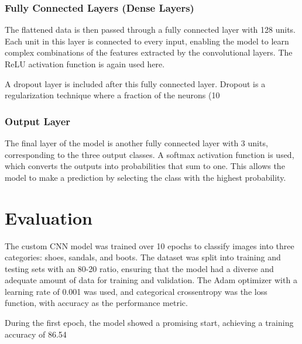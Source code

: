 \documentclass{article}
\begin{document}
            \subsubsection{Fully Connected Layers (Dense Layers)}

                The flattened data is then passed through a fully connected layer with 128 units. Each unit in this layer is connected to every input, enabling the model to learn complex combinations of the features extracted by the convolutional layers. The ReLU activation function is again used here.
                
                A dropout layer is included after this fully connected layer. Dropout is a regularization technique where a fraction of the neurons (10%

            \subsubsection{Output Layer}

                The final layer of the model is another fully connected layer with 3 units, corresponding to the three output classes. A softmax activation function is used, which converts the outputs into probabilities that sum to one. This allows the model to make a prediction by selecting the class with the highest probability.

        
\section{Evaluation}

    The custom CNN model was trained over 10 epochs to classify images into three categories: shoes, sandals, and boots. The dataset was split into training and testing sets with an 80-20 ratio, ensuring that the model had a diverse and adequate amount of data for training and validation. The Adam optimizer with a learning rate of 0.001 was used, and categorical crossentropy was the loss function, with accuracy as the performance metric.

    During the first epoch, the model showed a promising start, achieving a training accuracy of 86.54%
\end{document}
